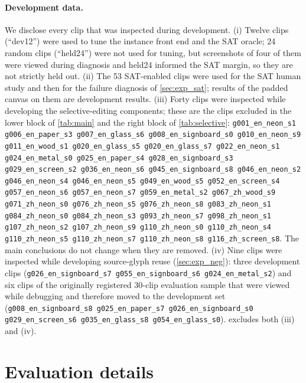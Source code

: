

\paragraph{Development data.} We disclose every clip that was inspected during development. (i) Twelve clips (``dev12'') were used to tune the instance front end and the SAT oracle; 24 random clips (``held24'') were not used for tuning, but screenshots of four of them were viewed during diagnosis and held24 informed the SAT margin, so they are not strictly held out. (ii) The 53 SAT-enabled clips were used for the SAT human study and then for the failure diagnosis of \cref{sec:exp_sat}; results of the padded canvas on them are development results. (iii) Forty clips were inspected while developing the selective-editing components; these are the clips excluded in the lower block of \cref{tab:main} and the right block of \cref{tab:selective}:
{\scriptsize\texttt{g001\_en\_neon\_s1 g006\_en\_paper\_s3 g007\_en\_glass\_s6 g008\_en\_signboard\_s0 g010\_en\_neon\_s9 g011\_en\_wood\_s1 g020\_en\_glass\_s5 g020\_en\_glass\_s7 g022\_en\_neon\_s1 g024\_en\_metal\_s0 g025\_en\_paper\_s4 g028\_en\_signboard\_s3 g029\_en\_screen\_s2 g036\_en\_neon\_s6 g045\_en\_signboard\_s8 g046\_en\_neon\_s2 g046\_en\_neon\_s4 g046\_en\_neon\_s5 g049\_en\_wood\_s5 g052\_en\_screen\_s4 g057\_en\_neon\_s6 g057\_en\_neon\_s7 g059\_en\_metal\_s2 g067\_zh\_wood\_s9 g071\_zh\_neon\_s0 g076\_zh\_neon\_s5 g076\_zh\_neon\_s8 g083\_zh\_neon\_s1 g084\_zh\_neon\_s0 g084\_zh\_neon\_s3 g093\_zh\_neon\_s7 g098\_zh\_neon\_s1 g107\_zh\_neon\_s2 g107\_zh\_neon\_s9 g110\_zh\_neon\_s0 g110\_zh\_neon\_s4 g110\_zh\_neon\_s5 g110\_zh\_neon\_s7 g110\_zh\_neon\_s8 g116\_zh\_screen\_s8}.} The main conclusions do not change when they are removed. (iv) Nine clips were inspected while developing source-glyph reuse (\cref{sec:exp_neg}): three development clips ({\scriptsize\texttt{g026\_en\_signboard\_s7 g055\_en\_signboard\_s6 g024\_en\_metal\_s2}}) and six clips of the originally registered 30-clip evaluation sample that were viewed while debugging and therefore moved to the development set ({\scriptsize\texttt{g008\_en\_signboard\_s8 g025\_en\_paper\_s7 g026\_en\_signboard\_s0 g029\_en\_screen\_s6 g035\_en\_glass\_s8 g054\_en\_glass\_s0}}).  excludes both (iii) and (iv).

\section{Evaluation details}
\label{sec:supp_eval}

